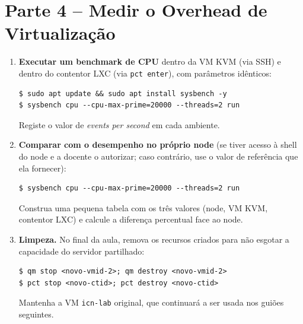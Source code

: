 \documentclass[11pt,a4paper]{article}
\begin{document}
\section{Parte 4 -- Medir o Overhead de Virtualização}
\begin{enumerate}[label=\arabic*.,resume]

  \item \textbf{Executar um benchmark de CPU} dentro da VM KVM (via SSH) e dentro do contentor LXC (via \texttt{pct enter}), com parâmetros idênticos:
\begin{lstlisting}
$ sudo apt update && sudo apt install sysbench -y
$ sysbench cpu --cpu-max-prime=20000 --threads=2 run
\end{lstlisting}
  Registe o valor de \emph{events per second} em cada ambiente.

  \item \textbf{Comparar com o desempenho no próprio node} (se tiver acesso à shell do node e a docente o autorizar; caso contrário, use o valor de referência que ela fornecer):
\begin{lstlisting}
$ sysbench cpu --cpu-max-prime=20000 --threads=2 run
\end{lstlisting}
  Construa uma pequena tabela com os três valores (node, VM KVM, contentor LXC) e calcule a diferença percentual face ao node.

  \item \textbf{Limpeza.} No final da aula, remova os recursos criados para não esgotar a capacidade do servidor partilhado:
\begin{lstlisting}
$ qm stop <novo-vmid-2>; qm destroy <novo-vmid-2>
$ pct stop <novo-ctid>; pct destroy <novo-ctid>
\end{lstlisting}
  Mantenha a VM \texttt{icn-lab} original, que continuará a ser usada nos guiões seguintes.

\end{enumerate}
\end{document}
